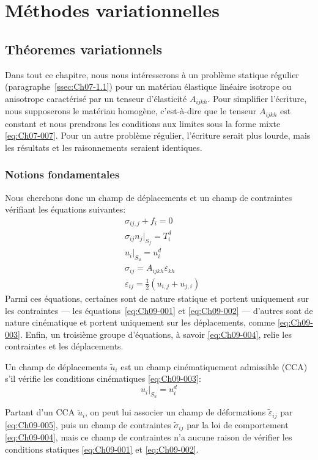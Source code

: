 \chapter{Méthodes variationnelles} \label{chap:Ch09}
\section{Théoremes variationnels} \label{sec:Ch09-1}
Dans tout ce chapitre, nous nous intéresserons à un problème statique régulier (paragraphe~\ref{ssec:Ch07-1.1}) pour un matériau élastique linéaire isotrope ou anisotrope caractérisé par un tenseur d'élasticité $A_{ijkh}$.
Pour simplifier l'écriture, nous supposerons le matériau homogène, c'est-à-dire que le tenseur $A_{ijkh}$ est constant et nous prendrons les conditions aux limites sous la forme mixte \eqref{eq:Ch07-007}.
Pour un autre problème régulier, l'écriture serait plus lourde, mais les résultats et les raisonnements seraient identiques.
\subsection{Notions fondamentales} \label{ssec:Ch09-1.1}
Nous cherchons donc un champ de déplacements et un champ de contraintes vérifiant les équations suivantes:
\begin{align}
    & \sigma_{ij,j} + f_i = 0 \label{eq:Ch09-001} \\
    & \sigma_{ij} n_j |_{S_f} = T_i^d \label{eq:Ch09-002} \\
    & u_i |_{S_u} = u_i^d \label{eq:Ch09-003} \\
    & \sigma_{ij} = A_{ijkh} \varepsilon_{kh} \label{eq:Ch09-004} \\
    & \varepsilon_{ij} = \frac{1}{2} \left( u_{i,j} + u_{j,i} \right) \label{eq:Ch09-005}
\end{align}
Parmi ces équations, certaines sont de nature statique et portent uniquement sur les contraintes --- les équations~\eqref{eq:Ch09-001} et \eqref{eq:Ch09-002} --- d'autres sont de  nature cinématique  et portent uniquement  sur  les déplacements, comme \eqref{eq:Ch09-003}.  
Enfin, un troisième groupe d'équations, à savoir \eqref{eq:Ch09-004}, relie les contraintes et les déplacements.
\begin{deff}
    Un champ de déplacements $\tilde{u}_i$ est un champ cinématiquement admissible (CCA) s'il vérifie les conditions cinématiques \eqref{eq:Ch09-003}:
    \begin{equation}
        u_i |_{S_u} = u_i^d
        \label{eq:Ch09-006}
    \end{equation}
\end{deff}
Partant d'un CCA $\tilde{u}_i$, on peut lui associer un champ de déformations $\tilde{\varepsilon}_{ij}$ par \eqref{eq:Ch09-005}, puis un champ de contraintes $\tilde{\sigma}_{ij}$ par la loi de comportement \eqref{eq:Ch09-004}, mais ce champ de contraintes n'a aucune raison de vérifier les conditions statiques \eqref{eq:Ch09-001} et \eqref{eq:Ch09-002}. 

